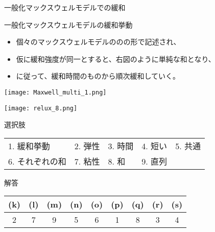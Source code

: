\documentclass[uplatex,dvipdfmx,a4paper,11pt]{jsarticle}
\begin{document}
\begin{qlist}
\begin{qlist2}
			\vspace{5mm}
			\qitem 一般化マックスウェルモデルでの緩和
			\begin{center}
				\begin{minipage}{0.86\textwidth}
					\begin{itembox}[l]{一般化マックスウェルモデルの緩和挙動}
						\begin{itemize}
							\item 個々のマックスウェルモデルの\qbox{}の\qbox{}の形で記述され、
							\item 仮に緩和強度が同一とすると、右図のように単純な和となり、
							\item \qbox{}に従って、緩和時間の\qbox{}ものから順次緩和していく。
						\end{itemize}
					\end{itembox}
				\end{minipage}
				\begin{minipage}{0.43\textwidth}
					\begin{center}
						\texttt{[image: Maxwell\_multi\_1.png]}
					\end{center}
				\end{minipage}
				\begin{minipage}{0.43\textwidth}
					\begin{center}
						\texttt{[image: relux\_8.png]}
					\end{center}
				\end{minipage}
			\end{center}
				
		\end{qlist2}

		\begin{itembox}[l]{選択肢}
			\begin{center}
				\begin{tabular}{lllll}
					1. 緩和挙動	&2. 弾性	&3. 時間	&4. 短い	&5. 共通\\
					6. それぞれの和	&7. 粘性		&8. 和	&9. 直列
				\end{tabular}
			\end{center}
		\end{itembox}
\end{qlist}

\begin{itembox}[l]{解答}
    \begin{center} 
      \begin{tabular}{|c|c|c|c|c|c|c|c|c|} \hline
        (k) & (l) & (m) & (n) & (o) & (p) & (q) & (r) & (s)\\ \hline
         2 & 7 & 9 & 5 & 6 & 1 & 8 & 3 & 4 \\ \hline		
      \end{tabular}
    \end{center}
\end{itembox}
\end{document}
